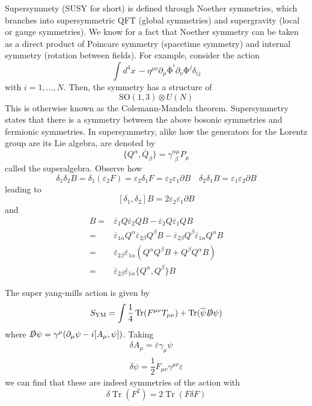 \begin{defi}
Supersymmety (SUSY for short) is defined through Noether symmetries, which branches into supersymmetric QFT (global symmetries) and supergravity (local or gauge symmetries). We know for a fact that Noether symmetry can be taken as a direct product of Poincare symmetry (spacetime symmetry) and internal symmetry (rotation between fields). For example, consider the action
\[\int d^{4}x\,-\eta ^{\mu \nu }\partial _{\mu }\overline{\mathrm{\Phi}}  ^{i}\partial _{\nu }\mathrm{\Phi} ^{j}\delta _{ij}\]
with $i=1,\ldots ,N$. Then, the symmetry has a structure of 
\[\mathrm{SO}(1,3)\otimes U(N)\]
This is otherwise known as the Colemann-Mandela theorem. Supersymmetry states that there is a symmetry between the above bosonic symmetries and fermionic symmetries. In supersymmetry, alike how the generators for the Lorentz group are its Lie algebra, are denoted by
\[\{Q^{\alpha },\overline{Q}_{\beta }\}=\gamma ^{\alpha \mu }_{\ \ \beta }P_{\mu }\]
called the superalgebra. Observe how
\[\delta_1\delta_2B=\delta_1(\varepsilon_2F)=\varepsilon_2\delta_1F=\varepsilon_2\varepsilon_1\partial B\quad \delta_2\delta_1B=\varepsilon_1\varepsilon_2\partial B\]
leading to
\[[\delta_1,\delta_2]B=2\varepsilon_2\varepsilon_1\partial B\]
and
\begin{align*}
[\overline{\varepsilon }_{1}Q,\overline{\varepsilon }_{2}Q]B=&\overline{\varepsilon }_{1}Q\overline{\varepsilon }_{2}QB-\overline{\varepsilon }_{2}Q\overline{\varepsilon }_{1}QB\\
=&\overline{\varepsilon }_{1\alpha }Q^{\alpha }\overline{\varepsilon }_{2\beta }Q^{\beta }B-\overline{\varepsilon }_{2\beta }Q^{\beta }\overline{\varepsilon }_{1\alpha }Q^{\alpha }B\\
=&\overline{\varepsilon }_{2\beta }\overline{\varepsilon }_{1\alpha }(Q^{\alpha }Q^{\beta }B+Q^{\beta }Q^{\alpha }B)\\
=&\overline{\varepsilon }_{2\beta }\overline{\varepsilon }_{1\alpha }\{Q^{\alpha },Q^{\beta }\}B
\end{align*}
\end{defi}
\vspace{2ex}
\begin{rmk}
The super yang-mills action is given by
\[S_{\mathrm{YM}}=\int \dfrac{1}{4}\mathop{\mathrm{Tr}}(F^{\mu \nu }T_{\mu \nu })+\mathop{\mathrm{Tr}}(\overline{\psi }\slashed{D}\psi )\]
where $\slashed{D}\psi =\gamma ^{\mu }(\partial _{\mu }\psi -i[A_{\mu },\psi ])$. Taking 
\begin{align*}
\delta A_{\mu }=\overline{\varepsilon }\gamma _{\mu }\psi \\
\delta \psi =\dfrac{1}{2}F_{\mu \nu }\gamma ^{\mu \nu }\varepsilon 
\end{align*}
we can find that these are indeed symmetries of the action with
\[\delta \mathop{\mathrm{Tr}}(F^2)=2\mathop{\mathrm{Tr}}(F\delta F)\]
\end{rmk}

